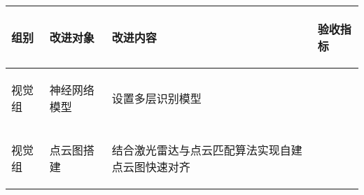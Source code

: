 
\begin{longtable}{ p{1.5cm} | p{3cm} | p{6cm} | p{4.3cm} |}

    \hline

    \endfoot
    
    \rowcolor{tabhdcolor}

        \begin{center}
            组别
        \end{center} &
        \begin{center}
            改进对象
        \end{center} &
        \begin{center}
            改进内容
        \end{center} &
        \begin{center}
            验收指标
        \end{center}\\

    \hline

    \endhead

        \begin{center}
            视觉组
        \end{center} &
        \begin{center}
            神经网络模型
        \end{center} &
        \begin{center}
            设置多层识别模型
        \end{center} &
        \begin{center}
            
        \end{center}\\
        
    \hline
        \begin{center}
            视觉组
        \end{center}&
        \begin{center}
            点云图搭建
        \end{center}&
        \begin{center}
            结合激光雷达与点云匹配算法实现自建点云图快速对齐
        \end{center}&
        \begin{center}
            
        \end{center}\\
        
    \hline
    
\end{longtable}
